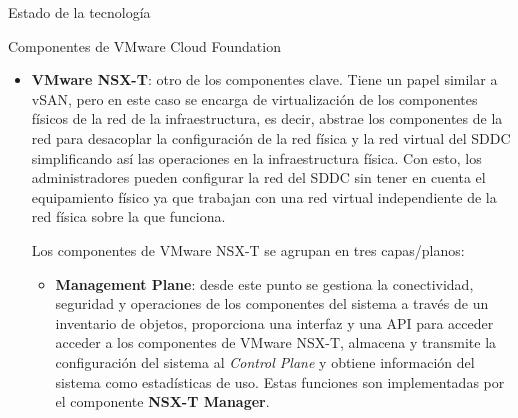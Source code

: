 \begin{section}{Estado de la tecnología}
\begin{subsection}{Componentes de VMware Cloud Foundation \cite{componentesCloudFound}}
\begin{itemize}
    \item \textbf{VMware NSX-T}: otro de los componentes clave. Tiene un papel similar a vSAN, pero en este caso se encarga de virtualización de los componentes físicos de la red de la infraestructura, es decir, abstrae los componentes de la red para desacoplar la configuración de la red física y la red virtual del SDDC simplificando así las operaciones en la infraestructura física. Con esto, los administradores pueden configurar la red del SDDC sin tener en cuenta el equipamiento físico ya que trabajan con una red virtual independiente de la red física sobre la que funciona.

    Los componentes de VMware NSX-T se agrupan en tres capas/planos\cite{componentesNSX}:
    \begin{itemize}
        \item \textbf{Management Plane}: desde este punto se gestiona la conectividad, seguridad y operaciones de los componentes del sistema a través de un inventario de objetos, proporciona una interfaz y una API para acceder acceder a los componentes de VMware NSX-T, almacena y transmite la configuración del sistema al \textit{Control Plane} y obtiene información del sistema como estadísticas de uso. Estas funciones son implementadas por el componente \textbf{NSX-T Manager}.
            

\end{itemize}
\end{itemize}
\end{subsection}
\end{section}
